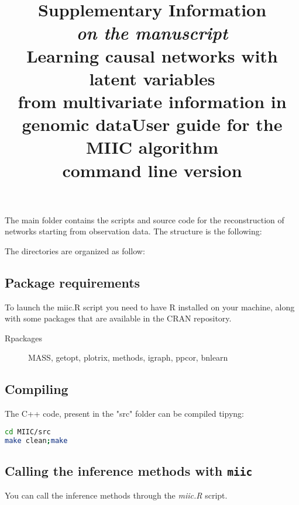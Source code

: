\documentclass[12pt]{article}
\title{Supplementary Information\\
{\small \em on the manuscript}\\
Learning causal networks with latent variables\\ from multivariate information in genomic data} %
\title{User guide for the MIIC algorithm\\command line version}
\begin{document}
\maketitle
\date{}

The main folder contains the scripts and source code for the reconstruction of networks starting from observation data. The structure is the following:


The directories are organized as follow:



\subsection*{Package requirements}
To launch the miic.R script you need to have R installed on your machine, along with some packages that are available in the CRAN repository. 
\begin{description}
		\item[Rpackages]	MASS, getopt, plotrix, methods, igraph, ppcor, bnlearn   
\end{description}

\subsection*{Compiling}
The C++ code, present in the "src" folder can be compiled tipyng:
\begin{lstlisting}[language=bash]
cd MIIC/src
make clean;make
\end{lstlisting}


	
\subsection*{Calling the inference methods with {\tt miic}}

You can call the inference methods through the \textit{miic.R} script.
\end{document}
